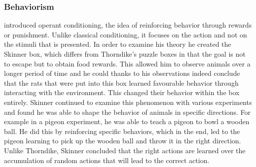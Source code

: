 \subsubsection{Behaviorism}
\citet{skinner1963operant} introduced operant conditioning, the idea of reinforcing behavior through rewards or punishment. Unlike classical conditioning, it focuses on the action and not on the stimuli that is presented. In order to examine his theory he created the Skinner box, which differs from Thorndike's puzzle boxes in that the goal is not to escape but to obtain food rewards. %
This allowed him to observe animals over a longer period of time and he could thanks to his observations indeed conclude that the rats that were put into this box learned favourable behavior through interacting with the environment. %
This changed their behavior within the box entirely.  %
Skinner continued to examine this phenomenon with various experiments and found he was able to shape the behavior of animals in specific directions. For example in a pigeon experiment, he was able to teach a pigeon to bowl a wooden ball. %
He did this by reinforcing specific behaviors, which in the end, led to the pigeon learning to pick up the wooden ball and throw it in the right direction. Unlike Thorndike, Skinner concluded that the right actions are learned over the accumulation of random actions that will lead to the correct action. %



